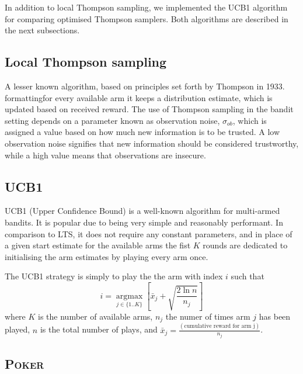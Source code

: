 In addition to local Thompson sampling, we implemented the UCB1 algorithm for 
comparing optimised Thompson samplers. Both algorithms are described in the next 
subsections.

\subsection{Local Thompson sampling}
A lesser known algorithm, based on principles set forth by Thompson in 1933. 
formattingfor every available arm it keeps a distribution estimate, which is 
updated based on received reward. The use of Thompson sampling in the bandit 
setting depends on a parameter known as observation noise, $\sigma_{ob}$, which 
is assigned a value based on how much new information is to be trusted. A low 
observation noise signifies that new information should be considered 
trustworthy, while a high value means that observations are insecure. 

\subsection{UCB1}

UCB1 \cite{Auer02UCB1} (Upper Confidence Bound) is a well-known algorithm for multi-armed bandits.
It is popular due to being very simple and reasonably performant. In comparison 
to LTS, it does not require any constant parameters, and in place of a given 
start estimate for the available arms the fist $K$ rounds are dedicated to 
initialising the arm estimates by playing every arm once.

The UCB1 strategy is simply to play the the arm with index $i$ such that
\begin{displaymath}
    i = \operatorname*{argmax}_{j \in \{ 1..K \}} \left[ \bar{x}_j + 
    \sqrt{\frac{2 \ln{n}}{n_j}} \right]
\end{displaymath}
where $K$ is the number of available arms, $n_j$ the numer of times arm $j$ has 
been played, $n$ is the total number of plays, and $\bar{x}_j 
=\frac{(\text{cumulative reward for arm j})}{n_j}$.

\subsection{\textsc{Poker}}

